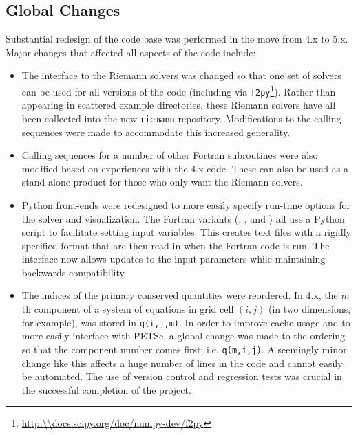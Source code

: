 %
%
%

\subsection{Global Changes}
Substantial redesign of the \clawpack code base was performed in the move
from \clawpack 4.x to 5.x.
Major changes that affected all aspects of the code include:
\begin{itemize}
    \item The interface to the \clawpack Riemann solvers was changed so that one
    set of solvers can be used for all versions of the code (including \pyclaw
    via
    \texttt{f2py}\footnote{\url{http:\\docs.scipy.org/doc/numpy-dev/f2py}}).  
    Rather than appearing in scattered example directories,
    these Riemann solvers have all been collected into the new
    \texttt{riemann} repository. Modifications to the
    calling sequences were made to accommodate this increased generality.
    \item Calling sequences for a number of other Fortran subroutines were also
    modified based on experiences with the \clawpack 4.x code.  These can also
    be used as a stand-alone product for those who only want the Riemann
    solvers.
    \item Python front-ends were redesigned to more easily
    specify run-time options for
    the solver and visualization.  The Fortran variants (\classic, \amrclaw, and
    \geoclaw) all use a Python script to facilitate setting input variables.
    This creates text files with a rigidly specified format that are then read
    in when the Fortran code is run. The interface now allows updates to the
    input parameters while maintaining backwards compatibility.
    \item The indices of the primary conserved quantities were reordered.  In
    \clawpack 4.x, the $m$th component of a
    system of equations in grid cell $(i,j)$ (in two dimensions, for example),
    was stored in \texttt{q(i,j,m)}.  In order to improve cache usage and to
    more easily interface with PETSc, a global
    change was made to the ordering so that the component number comes
    first; i.e. \texttt{q(m,i,j)}.  A seemingly minor change like this affects a
    huge number of lines in the code and cannot easily be automated. The use of
    version control and regression tests was crucial in the successful
    completion of the project. 
\end{itemize}
